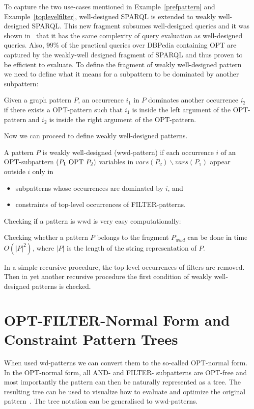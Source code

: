 To capture the two use-cases mentioned in
Example~\ref{prefpattern} and Example~\ref{toplevelfilter}, well-designed SPARQL is extended to weakly well-designed SPARQL.
This new fragment subsumes well-designed queries and it was shown in~\cite{kaminski_bwd} 
that it has the same complexity 
of query evaluation as well-designed queries. 
Also, $99\%$ of the practical queries over DBPedia containing OPT are captured
by the weakly-well designed fragment of SPARQL and thus proven to be efficient to evaluate.
To define the fragment of weakly well-designed pattern we need to define what it
means for a subpattern to be dominated by another subpattern:
\begin{definition}
	Given a graph pattern $P$, an occurrence $i_1$ in $P$ dominates another
	occurrence $i_2$ if there exists a OPT-pattern such
	that $i_1$ is inside the left argument of the OPT-pattern and $i_2$ is
	inside the right argument of the OPT-pattern.
\end{definition}

Now we can proceed to define weakly well-designed patterns.
\begin{definition}
	A pattern $P$ is weakly well-designed (wwd-pattern) if each occurrence $i$
	of an OPT-subpattern $(P_1\mbox{ OPT } P_2)$ variables in $vars(P_2) \backslash
	vars(P_1)$ appear outside $i$ only in
	\begin{itemize}
		\item subpatterns whose occurrences are dominated by $i$, and
		\item constraints of top-level occurrences of FILTER-patterns.
	\end{itemize}
\end{definition}
Checking if a pattern is wwd is very easy computationally:
\begin{proposition}
	Checking whether a pattern $P$ belongs to the fragment $P_{wwd}$ can be done
	in time $O(|P|^2)$, where $|P|$ is the length of the string representation
	of $P$.
\end{proposition}
\begin{proofidea}
	In a simple recursive procedure, the top-level occurrences of filters are
	removed.  Then in yet another recursive procedure  the first condition of
	weakly well-designed patterns is checked. 
\end{proofidea}

\section{OPT-FILTER-Normal Form and Constraint Pattern Trees}
When used wd-patterns we can convert them to the so-called
OPT-normal form. In the OPT-normal form, all AND- and FILTER- subpatterns are
OPT-free and most importantly the pattern can then be naturally represented as a
tree. The resulting tree can be used to visualize how to evaluate and optimize
the original pattern~\cite{letelier2013static, pichler2014containment}. The tree
notation can be generalised to wwd-patterns.

